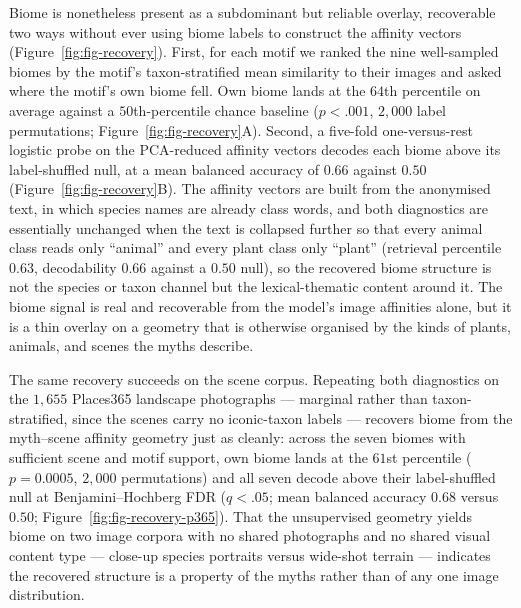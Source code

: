 \documentclass[11pt,a4paper]{article}
\begin{document}
Biome is nonetheless present as a subdominant but reliable overlay,
recoverable two ways without ever using biome labels to construct
the affinity vectors (Figure~\ref{fig:fig-recovery}). First, for
each motif we ranked the nine well-sampled biomes by the motif's
taxon-stratified mean similarity to their images and asked where
the motif's own biome fell. Own biome lands at the $64$th
percentile on average against a $50$th-percentile chance baseline
($p<.001$, $2{,}000$ label permutations; Figure~\ref{fig:fig-recovery}A).
Second, a
five-fold one-versus-rest logistic probe on the PCA-reduced
affinity vectors decodes each biome above its label-shuffled null,
at a mean balanced accuracy of $0.66$ against $0.50$
(Figure~\ref{fig:fig-recovery}B). The affinity vectors are built
from the anonymised text, in which species names are already class
words, and both diagnostics are essentially unchanged when the text
is collapsed further so that every animal class reads only
``animal'' and every plant class only ``plant'' (retrieval
percentile $0.63$, decodability $0.66$ against a $0.50$ null), so
the recovered biome structure is not the species or taxon channel
but the lexical-thematic content around it. The biome signal is
real and recoverable from the model's image affinities alone, but
it is a thin overlay on a geometry that is otherwise organised by
the kinds of plants, animals, and scenes the myths describe.

The same recovery succeeds on the scene corpus. Repeating both
diagnostics on the $1{,}655$ Places365 landscape photographs ---
marginal rather than taxon-stratified, since the scenes carry no
iconic-taxon labels --- recovers biome from the myth--scene affinity
geometry just as cleanly: across the seven biomes with sufficient
scene and motif support, own biome lands at the $61$st percentile
($p=0.0005$, $2{,}000$ permutations) and all seven decode above their
label-shuffled null at Benjamini--Hochberg FDR ($q<.05$; mean balanced
accuracy $0.68$ versus $0.50$; Figure~\ref{fig:fig-recovery-p365}).
That the unsupervised geometry yields biome on two image corpora with
no shared photographs and no shared visual content type --- close-up
species portraits versus wide-shot terrain --- indicates the recovered
structure is a property of the myths rather than of any one image
distribution.
\end{document}
